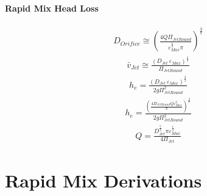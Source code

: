 \documentclass[letterpaper,10pt,english]{sphinxmanual}
\begin{document}
\subsubsection{Rapid Mix Head Loss}
\label{\detokenize{Rapid_Mix/RM_Design:rapid-mix-head-loss}}\begin{equation}\label{equation:Rapid_Mix/RM_Design:Rapid_Mix/RM_Design:5}
\begin{split}D_{Orifice} \cong \left( \frac{4 Q \Pi_{JetRound}}{\varepsilon_{Max}^{\frac{1}{3}} \pi} \right)^{\frac{3}{7}}\end{split}
\end{equation}\begin{equation}\label{equation:Rapid_Mix/RM_Design:Rapid_Mix/RM_Design:6}
\begin{split}\bar v_{Jet} \cong \frac{\left( D_{Jet} \, \varepsilon_{Max} \right)^{\frac{1}{3}}}{\Pi_{JetRound}}\end{split}
\end{equation}\begin{equation}\label{equation:Rapid_Mix/RM_Design:Rapid_Mix/RM_Design:7}
\begin{split}h_e = \frac{ \left( D_{Jet} \, \varepsilon_{Max} \right)^{\frac{2}{3}}}{ 2g \Pi_{JetRound}^2}\end{split}
\end{equation}\begin{equation}\label{equation:Rapid_Mix/RM_Design:Rapid_Mix/RM_Design:8}
\begin{split}h_e = \frac{ \left( \frac{4 \Pi_{JetRound} Q \varepsilon_{Max}^2}{\pi} \right)^{\frac{2}{7}}}{2 g \Pi_{JetRound}^2}\end{split}
\end{equation}
\begin{equation}\label{equation:Rapid_Mix/RM_Design:Rapid_Mix/RM_Design:9}
\begin{split}Q = \frac{D_{Jet}^{\frac{7}{3}} \pi \varepsilon_{Max}^{\frac{1}{3}}}{4 \Pi_{Jet}}\end{split}
\end{equation}

\chapter{Rapid Mix Derivations}
\label{\detokenize{Rapid_Mix/RM_Derivations:rapid-mix-derivations}}\label{\detokenize{Rapid_Mix/RM_Derivations:title-rapid-mix-derivations}}\label{\detokenize{Rapid_Mix/RM_Derivations::doc}}
\end{document}
